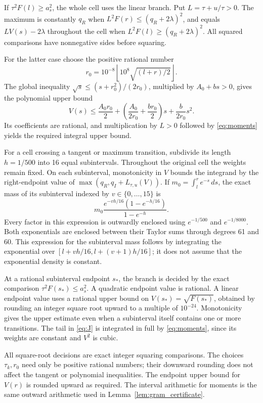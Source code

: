\documentclass[11pt]{article}
\theoremstyle{remark}\newtheorem{remark}[theorem]{Remark}
\begin{document}
If \(\tau^2F(l)\ge a_s^2\), the whole cell uses the linear
branch. Put \(L=\tau+u/\tau>0\). The maximum is constantly
\(q_R\) when \(L^2F(r)\le(q_R+2\lambda)^2\), and equals
\(LV(s)-2\lambda\) throughout the cell when
\(L^2F(l)\ge(q_R+2\lambda)^2\). All squared comparisons have
nonnegative sides before squaring.

For the latter case choose the positive rational number
\[
r_0=10^{-8}\left\lfloor10^8\sqrt{(l+r)/2}\right\rfloor.
\]
The global inequality \(\sqrt s\le(s+r_0^2)/(2r_0)\), multiplied
by \(A_0+bs>0\), gives the polynomial upper bound
\begin{equation}\label{eq:Vmajorant}
V(s)\le\frac{A_0r_0}{2}
+\left(\frac{A_0}{2r_0}+\frac{br_0}{2}\right)s
+\frac b{2r_0}s^2.
\end{equation}
Its coefficients are rational, and multiplication by \(L>0\)
followed by \eqref{eq:moments} yields the required integral upper
bound.

For a cell crossing a tangent or maximum transition, subdivide its
length \(h=1/500\) into 16 equal subintervals. Throughout the
original cell the weights remain fixed. On each subinterval,
monotonicity in \(V\) bounds the integrand by the right-endpoint
value of \(\max(q_R,q_I+L_{\tau,u}(V))\). If
\(m_0=\int_l^r e^{-s}\,ds\), the exact mass of its subinterval
indexed by \(v\in\{0,\ldots,15\}\) is
\begin{equation}\label{eq:subcell_mass}
 m_0\frac{e^{-vh/16}(1-e^{-h/16})}{1-e^{-h}}.
\end{equation}
Every factor in this expression is outwardly enclosed using
\(e^{-1/500}\) and \(e^{-1/8000}\). Both exponentials are enclosed
between their Taylor sums through degrees 61 and 60. This expression
for the subinterval mass follows by integrating the exponential over
\([l+vh/16,l+(v+1)h/16]\); it does not assume that the exponential
density is constant.

At a rational subinterval endpoint \(s_*\), the branch is decided
by the exact comparison \(\tau^2F(s_*)\le a_s^2\). A quadratic
endpoint value is rational. A linear endpoint value uses a rational
upper bound on \(V(s_*)=\sqrt{F(s_*)}\), obtained by rounding an
integer square root upward to a multiple of \(10^{-24}\).
Monotonicity gives the upper estimate even when a subinterval itself
contains one or more transitions. The tail in \eqref{eq:J} is
integrated in full by \eqref{eq:moments}, since its weights are
constant and \(V^2\) is cubic.

All square-root decisions are exact integer squaring comparisons.
The choices \(\tau_k,r_0\) need only be positive rational numbers;
their downward rounding does not affect the tangent or polynomial
inequalities. The endpoint upper bound for \(V(r)\) is rounded
upward as required. The interval arithmetic for moments is the same
outward arithmetic used in Lemma~\ref{lem:gram_certificate}.
\end{document}
